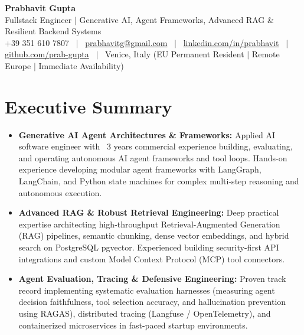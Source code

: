 \documentclass[a4paper,10pt]{article}
\begin{document}
\begin{minipage}[c]{0.80\textwidth}
  {\Huge\bfseries Prabhavit Gupta}\\[3pt]
  {\color{accent}\large Fullstack Engineer $\vert$ Generative AI, Agent Frameworks, Advanced RAG $\&$ Resilient Backend Systems}\\[6pt]
  {\footnotesize +39 351 610 7807 ~$\vert$~
  \href{mailto:prabhavitg@gmail.com}{prabhavitg@gmail.com} ~$\vert$~
  \href{https://www.linkedin.com/in/prabhavit}{linkedin.com/in/prabhavit} ~$\vert$~
  \href{https://github.com/prab-gupta}{github.com/prab-gupta} ~$\vert$~
  Venice, Italy (EU Permanent Resident $\vert$ Remote Europe $\vert$ Immediate Availability)}
\end{minipage}\hfill

\vspace{6pt}

\section{Executive Summary}
\begin{itemize}
  \item \textbf{Generative AI Agent Architectures \& Frameworks:} Applied AI software engineer with ~3 years commercial experience building, evaluating, and operating autonomous AI agent frameworks and tool loops. Hands-on experience developing modular agent frameworks with LangGraph, LangChain, and Python state machines for complex multi-step reasoning and autonomous execution.
  \item \textbf{Advanced RAG \& Robust Retrieval Engineering:} Deep practical expertise architecting high-throughput Retrieval-Augmented Generation (RAG) pipelines, semantic chunking, dense vector embeddings, and hybrid search on PostgreSQL pgvector. Experienced building security-first API integrations and custom Model Context Protocol (MCP) tool connectors.
  \item \textbf{Agent Evaluation, Tracing \& Defensive Engineering:} Proven track record implementing systematic evaluation harnesses (measuring agent decision faithfulness, tool selection accuracy, and hallucination prevention using RAGAS), distributed tracing (Langfuse / OpenTelemetry), and containerized microservices in fast-paced startup environments.
\end{itemize}

\end{document}
